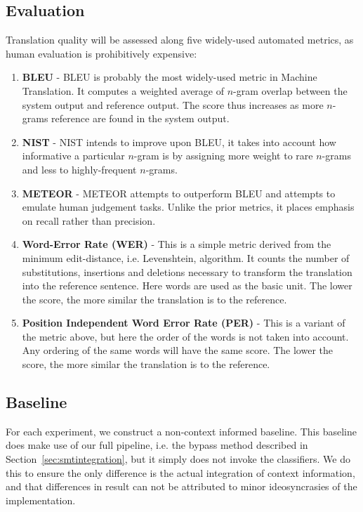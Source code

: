 \documentclass[smallextended]{svjour3}       %
\theoremstyle{break}
\begin{document}

\subsection{Evaluation}

Translation quality will be assessed along five widely-used automated metrics,
as human evaluation is prohibitively expensive:

\begin{enumerate} %
\item \textbf{BLEU} - BLEU \citep{BLEU} is probably the most widely-used metric
in Machine Translation. It computes a weighted average of $n$-gram overlap
between the system output and reference output. The score thus increases as
more $n$-grams reference are found in the system output.
\item \textbf{NIST} - NIST intends to improve upon BLEU, it takes into account
how informative a particular $n$-gram is by assigning more weight to rare
$n$-grams and less to highly-frequent $n$-grams.  \item \textbf{METEOR} -
METEOR \citep{METEOR} attempts to outperform BLEU and attempts to emulate human
judgement tasks. Unlike the prior metrics, it places emphasis on recall rather
than precision.
\item \textbf{Word-Error Rate (WER)} - This is a simple metric derived from the
minimum edit-distance, i.e. Levenshtein, algorithm. It counts the number of
substitutions, insertions and deletions necessary to transform the translation
into the reference sentence. Here words are used as the basic unit. The lower
the score, the more similar the translation is to the reference.  
\item \textbf{Position Independent Word Error Rate (PER)} - This is a variant of the
metric above, but here the order of the words is not taken into account. Any
ordering of the same words will have the same score. The lower the score, the
more similar the translation is to the reference.
\end{enumerate}

\subsection{Baseline}

For each experiment, we construct a non-context informed baseline. This
baseline does make use of our full pipeline, i.e. the bypass method described
in Section~\ref{sec:smtintegration}, but it simply does not invoke the
classifiers.  We do this to ensure the only difference is the actual
integration of context information, and that differences in result can not be
attributed to minor ideosyncrasies of the implementation.
\end{document}
